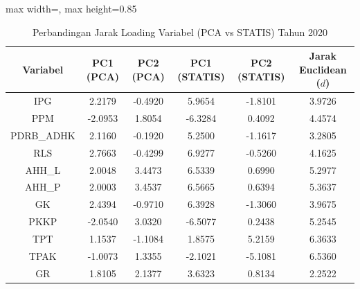 \begin{table}[H]
\centering
\caption{Perbandingan Jarak Loading Variabel (PCA vs STATIS) Tahun 2020} \label{tab:app1jarak_loading_2020}
\begin{adjustbox}{max width=\textwidth, max height=0.85\textheight}
\begin{tabular}{|c|c|c|c|c|c|}
\hline
\textbf{Variabel} & \textbf{PC1 (PCA)} & \textbf{PC2 (PCA)} & \textbf{PC1 (STATIS)} & \textbf{PC2 (STATIS)} & \textbf{Jarak Euclidean ($d$)} \\
\hline
IPG & 2.2179 & -0.4920 & 5.9654 & -1.8101 & 3.9726 \\
PPM & -2.0953 & 1.8054 & -6.3284 & 0.4092 & 4.4574 \\
PDRB\_ADHK & 2.1160 & -0.1920 & 5.2500 & -1.1617 & 3.2805 \\
RLS & 2.7663 & -0.4299 & 6.9277 & -0.5260 & 4.1625 \\
AHH\_L & 2.0048 & 3.4473 & 6.5339 & 0.6990 & 5.2977 \\
AHH\_P & 2.0003 & 3.4537 & 6.5665 & 0.6394 & 5.3637 \\
GK & 2.4394 & -0.9710 & 6.3928 & -1.3060 & 3.9675 \\
PKKP & -2.0540 & 3.0320 & -6.5077 & 0.2438 & 5.2545 \\
TPT & 1.1537 & -1.1084 & 1.8575 & 5.2159 & 6.3633 \\
TPAK & -1.0073 & 1.3355 & -2.1021 & -5.1081 & 6.5360 \\
GR & 1.8105 & 2.1377 & 3.6323 & 0.8134 & 2.2522 \\
\hline
\end{tabular}
\end{adjustbox}
\end{table}